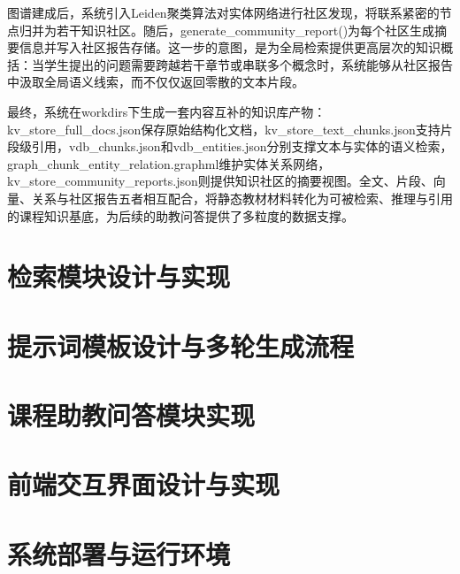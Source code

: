 图谱建成后，系统引入Leiden聚类算法对实体网络进行社区发现，将联系紧密的节点归并为若干知识社区。随后，generate_community_report()为每个社区生成摘要信息并写入社区报告存储。这一步的意图，是为全局检索提供更高层次的知识概括：当学生提出的问题需要跨越若干章节或串联多个概念时，系统能够从社区报告中汲取全局语义线索，而不仅仅返回零散的文本片段。

最终，系统在workdirs下生成一套内容互补的知识库产物：kv_store_full_docs.json保存原始结构化文档，kv_store_text_chunks.json支持片段级引用，vdb_chunks.json和vdb_entities.json分别支撑文本与实体的语义检索，graph_chunk_entity_relation.graphml维护实体关系网络，kv_store_community_reports.json则提供知识社区的摘要视图。全文、片段、向量、关系与社区报告五者相互配合，将静态教材材料转化为可被检索、推理与引用的课程知识基底，为后续的助教问答提供了多粒度的数据支撑。

\section{检索模块设计与实现}


\section{提示词模板设计与多轮生成流程}

\section{课程助教问答模块实现}

\section{前端交互界面设计与实现}

\section{系统部署与运行环境}

